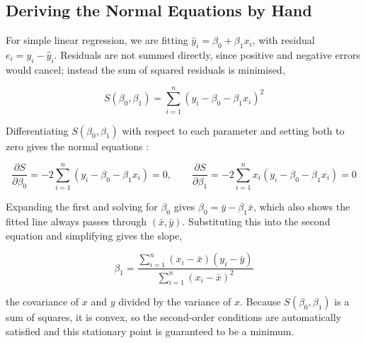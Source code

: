 \subsection*{Deriving the Normal Equations by Hand}
For simple linear regression, we are fitting $\hat y_i = \beta_0+\beta_1 x_i$, with residual $e_i = y_i - \hat y_i$. Residuals are not summed directly, since positive and negative errors would cancel; instead the sum of squared residuals is minimised,
\begin{mathbox}
\[
S(\beta_0,\beta_1) = \sum_{i=1}^n \left(y_i - \beta_0 - \beta_1 x_i\right)^2
\]
\end{mathbox}

\begin{theorem}
Differentiating $S(\beta_0,\beta_1)$ with respect to each parameter and setting both to zero gives the normal equations \citep{dobson2018,casella2002}:
\begin{mathbox}
\[
\frac{\partial S}{\partial \beta_0} = -2\sum_{i=1}^n \left(y_i-\beta_0-\beta_1 x_i\right) = 0, \qquad
\frac{\partial S}{\partial \beta_1} = -2\sum_{i=1}^n x_i\left(y_i-\beta_0-\beta_1 x_i\right) = 0
\]
\end{mathbox}
Expanding the first and solving for $\beta_0$ gives $\beta_0 = \bar y - \beta_1\bar x$, which also shows the fitted line always passes through $(\bar x,\bar y)$. Substituting this into the second equation and simplifying gives the slope,
\begin{mathbox}
\[
\beta_1 = \frac{\sum_{i=1}^n (x_i-\bar x)(y_i-\bar y)}{\sum_{i=1}^n (x_i-\bar x)^2}
\]
\end{mathbox}
the covariance of $x$ and $y$ divided by the variance of $x$. Because $S(\beta_0,\beta_1)$ is a sum of squares, it is convex, so the second-order conditions are automatically satisfied and this stationary point is guaranteed to be a minimum.
\end{theorem}

